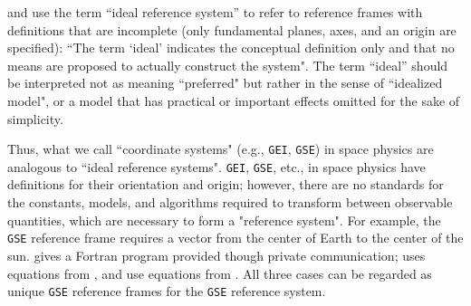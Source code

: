\documentclass[draft]{agujournal2019}
\begin{document}
 and  use the term ``ideal reference system'' to refer to reference frames with definitions that are incomplete (only fundamental planes, axes, and an origin are specified): ``The term `ideal' indicates the conceptual definition only and that no means are proposed to actually construct the system". The term ``ideal'' should be interpreted not as meaning ``preferred" but rather in the sense of ``idealized model", or a model that has practical or important effects omitted for the sake of simplicity.



Thus, what we call ``coordinate systems" (e.g., \texttt{GEI}, \texttt{GSE}) in space physics are analogous to ``ideal reference systems".  \texttt{GEI}, \texttt{GSE}, etc., in space physics have definitions for their orientation and origin; however, there are no standards for the constants, models, and algorithms required to transform between observable quantities, which are necessary to form a "reference system". For example, the \texttt{GSE} reference frame requires a vector from the center of Earth to the center of the sun.  gives a Fortran program provided though private communication;  uses equations from , and 
 use equations from . All three cases can be regarded as unique \texttt{GSE} reference frames for the \texttt{GSE} reference system.
\end{document}
